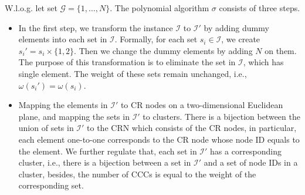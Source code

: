 \documentclass[10pt,journal,compsoc]{IEEEtran}
\makeatletter
\theoremstyle{mytheoremstyle}
\theoremstyle{mytheoremstyle}
\theoremstyle{mytheoremstyle}
\renewenvironment{proof}[1][\proofname]{%
      \par\pushQED{\qed}\fontfamily{ptm}\selectfont%
      \topsep6\p@\@plus6\p@\relax
      \trivlist\item[\hskip\labelsep\bfseries#1\@addpunct{.}]%
      \ignorespaces
    }{%
      \popQED\endtrivlist\@endpefalse
    }
\newcommand{\ie}{i.e., }
\makeatother
\begin{document}
\begin{proof}
W.l.o.g. let set $\mathcal{G} = \{ 1, \ldots , N \}$.
The polynomial algorithm $\sigma$ consists of three steps.

\begin{itemize}

\item In the first step, we transform the instance $\mathcal{I}$ to $\mathcal{I'}$ by adding dummy elements into each set in $\mathcal{I}$.
Formally, for each set $s_i\in \mathcal{I}$, we create $s_i' = s_i \times \{ 1,2\}$.
Then we change the dummy elements by adding $N$ on them.
The purpose of this transformation is to eliminate the set in $\mathcal{I}$, which has single element.
The weight of these sets remain unchanged, \ie $\omega(s_i') = \omega(s_i)$.

\item Mapping the elements in $\mathcal{I'}$ to CR nodes on a two-dimensional Euclidean plane, and mapping the sets in $\mathcal{I'}$ to clusters.
There is a bijection between the union of sets in $\mathcal{I'}$ to the CRN which consists of the CR nodes, in particular, each element one-to-one corresponds to the CR node whose node ID equals to the element.
We further regulate that, each set in $\mathcal{I'}$ has a corresponding cluster, \ie there is a bijection between a set in $\mathcal{I'}$ and a set of node IDs in a cluster, besides, the number of CCCs is equal to the weight of the corresponding set.



\end{itemize}
\end{proof}
\end{document}
